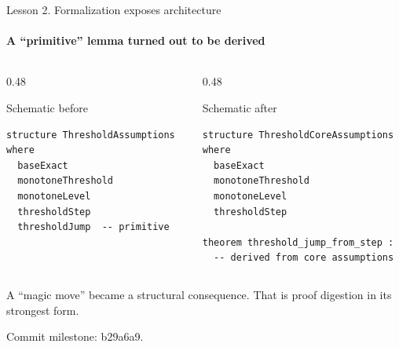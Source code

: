 \documentclass[aspectratio=169,11pt]{beamer}
\newcommand{\source}[1]{{\scriptsize\color{darkgray}#1}}
\begin{document}
\begin{frame}[fragile]{Lesson 2. Formalization exposes architecture}
\framesubtitle{A ``primitive'' lemma turned out to be derived}
\begin{columns}[T,totalwidth=\textwidth]
\begin{column}{0.48\textwidth}
\begin{block}{Schematic before}
{\scriptsize
\begin{verbatim}
structure ThresholdAssumptions where
  baseExact
  monotoneThreshold
  monotoneLevel
  thresholdStep
  thresholdJump  -- primitive
\end{verbatim}
}
\end{block}
\end{column}
\begin{column}{0.48\textwidth}
\begin{block}{Schematic after}
{\scriptsize
\begin{verbatim}
structure ThresholdCoreAssumptions where
  baseExact
  monotoneThreshold
  monotoneLevel
  thresholdStep

theorem threshold_jump_from_step :
  -- derived from core assumptions
\end{verbatim}
}
\end{block}
\end{column}
\end{columns}
\vspace{0.2cm}
\begin{center}
\Large A ``magic move'' became a structural consequence. That is proof digestion in its strongest form.
\end{center}
\source{Commit milestone: b29a6a9.}
\end{frame}
\end{document}
